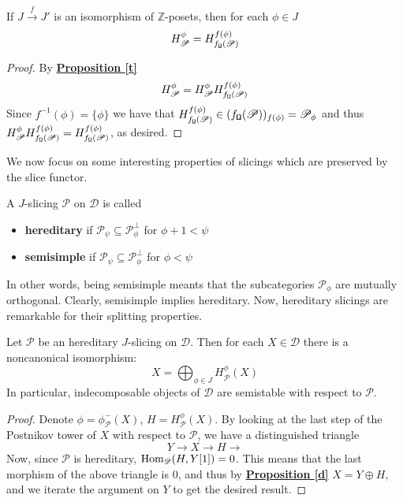 \begin{prop}\label{aae}
If $J \overset{f}{\longrightarrow} J'$ is an isomorphism of $\mathbb{Z}$-posets, then for each $\phi \in J$ $$ H^{\phi}_{\mathscr{P}}=H^{f(\phi)}_{f_{\textnormal{\Libra}}(\mathscr{P})}$$
\end{prop}

\begin{proof}
By \hyperref[t]{\textbf{Proposition \ref*{t}}} $$H^{\phi}_{\mathscr{P}} = H^{\phi}_{\mathscr{P}}H^{f(\phi)}_{f_{\textnormal{\Libra}}(\mathscr{P})}$$ Since $f^{-1}(\phi)=\{ \phi \}$ we have that $H^{f(\phi)}_{f_{\textnormal{\Libra}}(\mathscr{P})} \in (f_{\textnormal{\Libra}}(\mathscr{P}))_{f(\phi)}=\mathscr{P}_{\phi}$ and thus $H^{\phi}_{\mathscr{P}}H^{f(\phi)}_{f_{\textnormal{\Libra}}(\mathscr{P})}=H^{f(\phi)}_{f_{\textnormal{\Libra}}(\mathscr{P})}$, as desired. 
\end{proof}

We now focus on some interesting properties of slicings which are preserved by the slice functor. 

\begin{defn}
A $J$-slicing $\mathscr{P}$ on $\mathscr{D}$ is called 
\begin{itemize}
\item \textbf{hereditary} if  $\mathscr{P}_{\psi} \subseteq \mathscr{P}_{\phi }^{\perp}$ for $\phi +1 < \psi $
\item \textbf{semisimple} if  $\mathscr{P}_{\psi} \subseteq \mathscr{P}_{\phi }^{\perp}$ for $\phi < \psi$ 
\end{itemize}
\end{defn}

In other words, being semisimple meants that the subcategories $\mathscr{P}_{\phi}$ are mutually orthogonal. Clearly, semisimple implies hereditary. Now, hereditary slicings are remarkable for their splitting properties. 

\begin{prop}\label{lala}
Let $\mathscr{P}$ be an hereditary $J$-slicing on $\mathscr{D}$. Then for each $X \in \mathscr{D}$ there is a noncanonical isomorphism: $$X = \bigoplus_{\phi \in J}H_{\mathscr{P}}^{\phi}(X)$$
In particular, indecomposable objects of $\mathscr{D}$ are semistable with respect to $\mathscr{P}$.
\end{prop}

\begin{proof}
Denote $\phi=\phi^-_{\mathscr{P}}(X)$, $H= H^{\phi}_{\mathscr{P}}(X)$. By looking at the last step of the Postnikov tower of $X$ with respect to $\mathscr{P}$, we have a distinguished triangle $$Y \longrightarrow X \longrightarrow H \longrightarrow$$
Now, since $\mathscr{P}$ is hereditary, $\textnormal{Hom}_{\mathscr{D}}(H,Y[1])=0$. This means that the last morphism of the above triangle is $0$, and thus by \hyperref[d]{\textbf{Proposition \ref*{d}}} $X=Y \oplus H$, and we iterate the argument on $Y$ to get the desired result. 
\end{proof}


